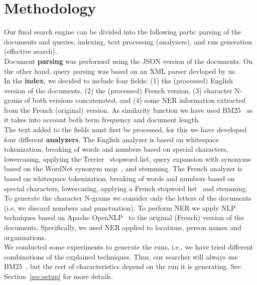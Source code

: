 \section{Methodology}
\label{sec:methodology}

Our final search engine can be divided into the following parts: parsing of the documents and queries, indexing,
text processing (analyzers), and run generation (effective search).\\

Document \textbf{parsing} was performed using the JSON version of the documents.
On the other hand, query parsing was based on an XML parser devloped by us.\\

In the \textbf{index}, we decided to include four fields: (1) the (processed) English version of the documents, (2) the
(processed) French version, (3) character N-grams of both versions concatenated, and (4) some NER information extracted
from the French (original) version.
As similarity function we have used BM25~\cite{BM25} as it takes into account both term frequency and document length.\\

The text added to the fields must first be processed, for this we have developed four different \textbf{analyzers}.
The English analyzer is based on whitespace tokenization, breaking of words and numbers based on special characters,
lowercasing, applying the Terrier~\cite{OunisEtAl2006} stopword list, query expansion with synonyms based on
the WordNet synonym map~\cite{wordnet}, and stemming.
The French analyzer is based on whitespace tokenization, breaking of words and numbers based on special characters,
lowercasing, applying a French stopword list~\cite{stopword_french} and stemming.
To generate the character N-grams we consider only the letters of the documents (i.e. we discard numbers and
punctuation).
To perform NER we apply NLP techniques based on Apache OpenNLP~\cite{ApacheOpenNLP} to the original (French) version of
the documents.
Specifically, we used NER applied to locations, person names and organizations.\\

We conducted some experiments to generate the runs, i.e., we have tried different combinations of the explained
techniques.
Thus, our searcher will always use BM25~\cite{BM25}, but the rest of characteristics depend on the run it is generating.
See Section~\ref{sec:setup} for more details.